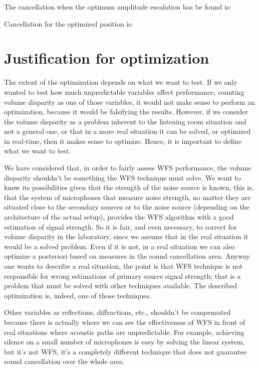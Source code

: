 The cancellation when the optimum amplitude escalation has be found is:

Cancellation for the optimized position is:

\section{Justification for optimization}
The extent of the optimization depends on what we want to test. If we only wanted to test how much unpredictable variables affect performance, counting volume disparity as one of those variables, it would not make sense to perform an optimization, because it would be falsifying the results. However, if we consider the volume disparity as a problem inherent to the listening room situation and not a general one, or that in a more real situation it can be solved, or optimized in real-time, then it makes sense to optimize. Hence, it is important to define what we want to test.

We have considered that, in order to fairly assess WFS performance, the volume disparity shouldn't be something the WFS technique must solve. We want to know its possibilities given that the strength of the noise source is known, this is, that the system of microphones that measure noise strength, no matter they are situated close to the secondary sources or to the noise source (depending on the architecture of the actual setup), provides the WFS algorithm with a good estimation of signal strength. So it is fair, and even necessary, to correct for volume disparity in the laboratory, since we assume that in the real situation it would be a solved problem. Even if it is not, in a real situation we can also optimize a posteriori based on measures in the sound cancellation area. Anyway one wants to describe a real situation, the point is that WFS technique is not responsible for wrong estimations of primary source signal strength; that is a problem that must be solved with other techniques available. The described optimization is, indeed, one of those techniques.

Other variables as reflections, diffractions, etc., shouldn't be compensated because there is actually where we can see the effectiveness of WFS in front of real situations where acoustic paths are unpredictable. For example, achieving silence on a small number of microphones is easy by solving the linear system, but it's not WFS, it's a completely different technique that does not guarantee sound cancellation over the whole area.